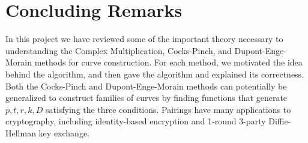 \documentclass[12pt,twoside]{article}
\begin{document}
\section{Concluding Remarks}
In this project we have reviewed some of the important theory necessary to understanding the Complex Multiplication, Cocks-Pinch, and Dupont-Enge-Morain methods for curve construction. For each method, we motivated the idea behind the algorithm, and then gave the algorithm and explained its correctness. Both the Cocks-Pinch and Dupont-Enge-Morain methods can potentially be generalized to construct families of curves by finding functions that generate $p,t,r,k,D$ satisfying the three conditions. Pairings have many applications to cryptography, including identity-based encryption and 1-round 3-party Diffie-Hellman key exchange.
\newpage


 

\end{document}
